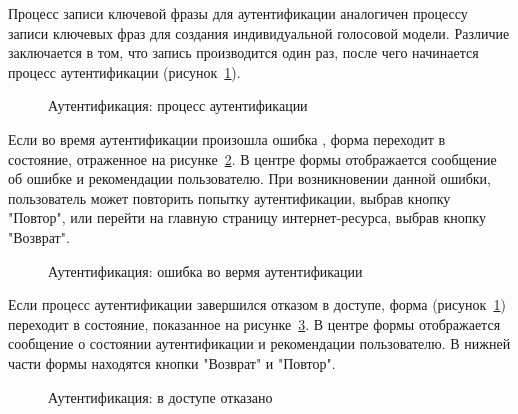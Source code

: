 Процесс записи ключевой фразы для аутентификации аналогичен процессу записи ключевых фраз для создания индивидуальной голосовой модели. Различие заключается в том, что запись производится один раз, после чего начинается процесс аутентификации (рисунок~\ref{fig:verification_in_process}). 


\begin{figure}[hbt!]
\caption{Аутентификация: процесс аутентификации}
\label{fig:verification_in_process}
\end{figure}

Если во время аутентификации произошла ошибка , форма переходит в состояние, отраженное на рисунке~\ref{fig:verification_error}. В центре формы отображается сообщение об ошибке и рекомендации пользователю. При возникновении данной ошибки, пользователь может повторить попытку аутентификации, выбрав кнопку "Повтор", или перейти на главную страницу интернет-ресурса, выбрав кнопку "Возврат". 


\begin{figure}[hbt!]
\caption{Аутентификация: ошибка во вермя аутентификации}
\label{fig:verification_error}
\end{figure}

Если процесс аутентификации завершился отказом в доступе, форма (рисунок~\ref{fig:verification_in_process}) переходит в состояние, показанное на рисунке~\ref{fig:verification_access_denied}. В центре формы отображается сообщение о состоянии аутентификации и рекомендации пользователю. В нижней части формы находятся кнопки "Возврат" и "Повтор".


\begin{figure}[hbt!]
\caption{Аутентификация: в доступе отказано}
\label{fig:verification_access_denied}
\end{figure}

